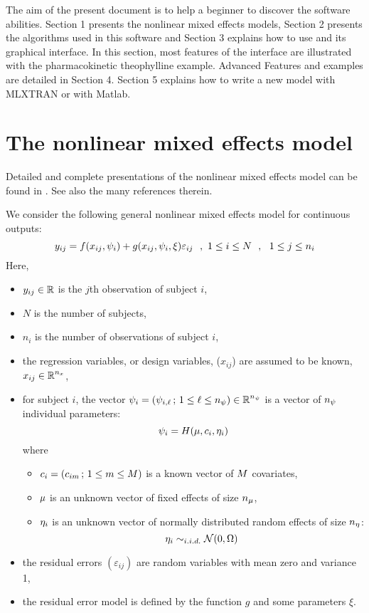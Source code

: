 The aim of the present document is to help a \monolix beginner to
discover the software abilities. Section 1 presents the nonlinear
mixed effects models, Section 2 presents the algorithms used in this
software and Section 3 explains how to use \monolix and its graphical
interface. In this section, most features of the \monolix interface
are illustrated with the pharmacokinetic theophylline example.
Advanced Features and examples are detailed in Section 4.
Section 5 explains how to write a new model with MLXTRAN or with
Matlab.



\section{The nonlinear mixed effects model}

Detailed and complete presentations of the nonlinear mixed effects model can be found in \cite{davgil2, davgil1, PB00}. See also the many references
therein.

We consider the following general nonlinear mixed effects model for continuous outputs:
\begin{equation}
\label{nlme}
y_{ij}=f(x_{ij},\psigi)+ g(x_{ij},\psigi,\xi)\varepsilon_{ij} \ \ , \ 1\leq i \leq N \ \ ,
\ \ 1 \leq j \leq n_i
\end{equation}
Here,
\begin{itemize}
\item $y_{ij}\in \mbox{$\mathbb{R}$}$ is the $j$th observation of subject $i$,
\item $N$ is the number of subjects,
\item $n_i$ is the number of observations of subject $i$,
\item the regression variables, or design variables, ($x_{ij}$) are assumed to be known, $x_{ij}\in
\mbox{$\mathbb{R}$}^{n_x}$,
\item for subject $i$, the vector ${\psi_i}=({\psi_{i,\ell}} \, ; \, 1\leq \ell \leq {n_\psi}) \in \mbox{$\mathbb{R}$}^{n_\psi}$ is a vector of ${n_\psi}$ individual parameters:
\begin{equation} \label{prior}
\psigi=H(\fixed_effect,\covariate_i,\etagi)
\end{equation}
where
\begin{itemize}
\item $c_i =(c_{im} \, ; \, 1\leq m \leq M)$ is a known vector of $M$ covariates,
\item $\fixed_effect$ is an unknown vector of fixed effects of size $\nbeta$,
\item ${\eta_i}$ is an unknown vector of normally distributed random effects of size ${n_\eta}$:
$${\eta_i} \sim_{i.i.d.} {\cal N}(0,{\Omega})$$
\end{itemize}

\item the residual errors $(\varepsilon_{ij})$  are random variables with mean zero and variance 1,
\item the residual error model is defined by the function $g$ and some parameters $\xi$.
\end{itemize}


